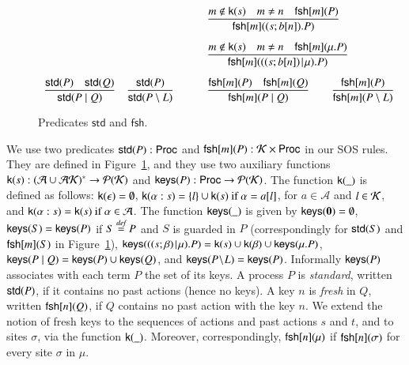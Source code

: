 {\begin{figure}[t]
\[\begin{array}{ll}
\qquad &
\Rule
{m \notin \kkey{s} \quad m \neq n \quad \fresh{m}{P}}
{\fresh{m}{(s;b[n]).P}}
\\[15pt]
%
&
\Rule
{m \notin \kkey{s} \quad m \neq n \quad \fresh{m}{\mu.P}}
{\fresh{m}{((s;b[n])\Mid \mu).P}}
\\[15pt]
\Rule
{\std{P} \quad \std{Q}}
{\std{P \paral Q}}\quad 
\Rule
{\std{P}}
{\std{P \setminus L}}
\qquad &
\Rule
{\fresh{m}{P} \quad \fresh{m}{Q}}
{\fresh{m}{P \paral Q}}
\qquad 
\Rule
{\fresh{m}{P}}
{\fresh{m}{P \setminus L}}
\end{array}
\] 
\caption{Predicates $\mathsf{std}$ and $\mathsf{fsh}$.} 
\label{fig:predicates}
\end{figure}
%
%
We use two predicates $\mathsf{std}(P):\mathsf{Proc}$ and $\mathsf{fsh}[m](P):\mathcal{K} \times \mathsf{Proc}$ in our SOS rules. 
They are defined in Figure~\ref{fig:predicates}, and they use two auxiliary functions
$\mathsf{k}(s): (\mathcal{A}\cup\mathcal{AK})^* \rightarrow \mathcal{P}(\mathcal{K})$ and
$\mathsf{keys}(P): \mathsf{Proc} \rightarrow \mathcal{P}(\mathcal{K})$. 
%
The function $\mathsf{k}(\_)$ is defined as follows:
$\mathsf{k}(\epsilon)=\emptyset$, $\mathsf{k}(\alpha:s)=\{l\}\cup\mathsf{k}(s) \text{ if }\alpha=a[l]$, for 
$a\in \mathcal{A}$ and $l\in \mathcal{K}$, and $\mathsf{k}(\alpha:s)= \mathsf{k}(s) \text{ if }\alpha \in \mathcal{A}$.
%
The function $\mathsf{keys}(\_)$ is given by $\mathsf{keys}(\mathbf{0})=\emptyset$, $\mathsf{keys}(S)=\mathsf{keys}(P)$ if $S\stackrel{\emph{def}}{=} P$ and $S$ is guarded in $P$
(correspondingly for $\mathsf{std}(S)$ and $\mathsf{fsh}[m](S)$ in Figure~\ref{fig:predicates}), 
$\mathsf{keys}(((s;\beta)\!\mid\! \mu).P)=\mathsf{k}(s) \cup \mathsf{k}(\beta) \cup \mathsf{keys}(\mu.P)$, $\mathsf{keys}(P \; \vert \; Q)= \mathsf{keys}(P) \cup \mathsf{keys}(Q)$, and $\mathsf{keys}(P \!\setminus\!L)=\mathsf{keys}(P)$. Informally $\mathsf{keys}(P)$ associates with each term $P$ the set of its keys. 
A process $P$ is \emph{standard}, written $\mathsf{std}(P)$, if it contains no past actions (hence no keys). 
A key $n$ is \emph{fresh} in $Q$, written $\mathsf{fsh}[n](Q)$, if $Q$ contains no past action with the key $n$.
We extend the notion of fresh keys to the sequences of actions and past actions $s$ and $t$, and to sites $\sigma$, 
via the function $\mathsf{k}(\_)$. Moreover, correspondingly, $\mathsf{fsh}[n](\mu)$ if $\mathsf{fsh}[n](\sigma)$ for every
site $\sigma$ in $\mu$. 

}
